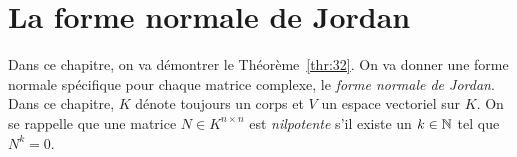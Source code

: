 
\chapter{La forme normale de Jordan}
\label{cha:la-forme-normale}




\noindent 
Dans ce chapitre, on va démontrer le Théorème~\ref{thr:32}.  On va donner une forme normale spécifique pour chaque matrice complexe, le \emph{forme normale de Jordan}.
Dans ce chapitre, $K$ dénote toujours un corps et $V$ un espace vectoriel sur $K$. 
On se rappelle que une  matrice $N ∈ K^{n ×n}$ est \emph{nilpotente} s'il existe un $k \in \mathbb{N}$ tel que $N^k = 0$.






